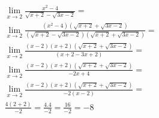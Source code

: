 \begin{ex}
\begin{align}
&\lim_{x\rightarrow 2} \frac{x^2-4}{\sqrt{x+2}-\sqrt{3x-2}}=\nonumber\\
&\lim_{x\rightarrow 2} \frac{(x^2-4)(\sqrt{x+2}+\sqrt{3x-2})}{(\sqrt{x+2}-\sqrt{3x-2})(\sqrt{x+2}+\sqrt{3x-2})}=\nonumber\\
&\lim_{x\rightarrow 2} \frac{(x-2)(x+2)(\sqrt{x+2}+\sqrt{3x-2})}{(x+2-3x+2)}=\nonumber\\
&\lim_{x\rightarrow 2} \frac{(x-2)(x+2)(\sqrt{x+2}+\sqrt{3x-2})}{-2x+4}=\nonumber\\
&\lim_{x\rightarrow 2} \frac{(x-2)(x+2)(\sqrt{x+2}+\sqrt{3x-2})}{-2(x-2)}=\nonumber\\
&\frac{4(2+2)}{-2}=\frac{4.4}{-2}=\frac{16}{-2}=-8\nonumber
\end{align}
\end{ex}